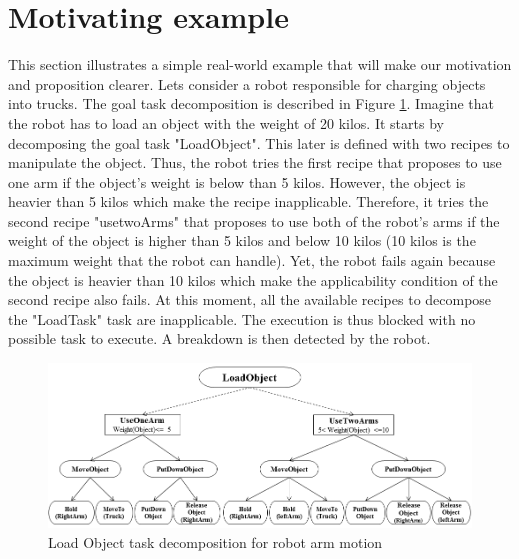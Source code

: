 \documentclass{llncs}
\begin{document}
		\section{Motivating example}
				\label{sec:example}
		\par This section illustrates a simple real-world example that will make our motivation and proposition clearer. Lets consider a robot responsible for charging objects into trucks. The  goal task decomposition is described in Figure \ref{fig:ex}. Imagine that the robot has to load an object with the weight of 20 kilos. It starts by decomposing the goal task "LoadObject". This later is defined with two recipes to manipulate the object. Thus, the robot tries the first recipe that proposes to use one arm if the object's weight is below than 5 kilos. However, the object is heavier than 5 kilos which make the recipe inapplicable. Therefore, it tries the second recipe "usetwoArms" that proposes to use both of the robot's arms if the weight of the object is higher than 5 kilos and below 10 kilos (10 kilos is the maximum weight that the robot can handle). Yet, the robot fails again because the object is heavier than 10 kilos which make the applicability condition of the second recipe also fails. At this moment, all the available recipes to decompose the "LoadTask" task are inapplicable. The execution is thus blocked with no possible task to execute. A breakdown is then detected by the robot. 
				\begin{figure}[]
				\includegraphics[width=\textwidth]{Figures/fig2.png}
				\caption{Load Object task decomposition for robot arm motion}
				\label{fig:ex}
				\end{figure}
\end{document}
